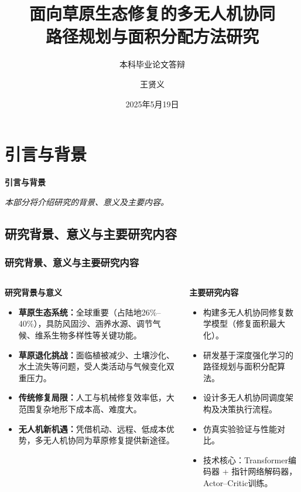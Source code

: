 \documentclass[11pt, aspectratio=169]{beamer}  %
\title{面向草原生态修复的多无人机协同\\路径规划与面积分配方法研究}
\subtitle{本科毕业论文答辩}
\author{王贤义}
\institute{兰州大学信息科学与工程学院}
\date{2025年5月19日}
\begin{document}
\section{引言与背景}
\begin{frame}
	\centering %
	{\Huge \sffamily\bfseries\textcolor{njupt}{引言与背景}}
	\par %
	\vspace{0.5cm} %
	{\large \itshape{本部分将介绍研究的背景、意义及主要内容。}} %
\end{frame}

\subsection{研究背景、意义与主要研究内容}
\begin{frame}
	\frametitle{研究背景、意义与主要研究内容}
	\begin{columns}[T]
		\begin{column}{0.5\textwidth} %
			\small %
			\textbf{研究背景与意义}
			\begin{itemize}
				\item \textbf{草原生态系统：}全球重要（占陆地26\%--40\%），具防风固沙、涵养水源、调节气候、维系生物多样性等关键功能。
				\item \textbf{草原退化挑战：}面临植被减少、土壤沙化、水土流失等问题，受人类活动与气候变化双重压力。
				\item \textbf{传统修复局限：}人工与机械修复效率低，大范围复杂地形下成本高、难度大。
				\item \textbf{无人机新机遇：}凭借机动、远程、低成本优势，多无人机协同为草原修复提供新途径。
			\end{itemize}
		\end{column}
		\begin{column}{0.5\textwidth} %
			\small %
			\textbf{主要研究内容}
			\begin{itemize}
				\item 构建多无人机协同修复数学模型（修复面积最大化）。
				\item 研发基于深度强化学习的路径规划与面积分配算法。
				\item 设计多无人机协同调度架构及决策执行流程。
				\item 仿真实验验证与性能对比。
				\item 技术核心：Transformer编码器 + 指针网络解码器，Actor--Critic训练。
			\end{itemize}
		\end{column}
	\end{columns}
\end{frame}
\end{document}
